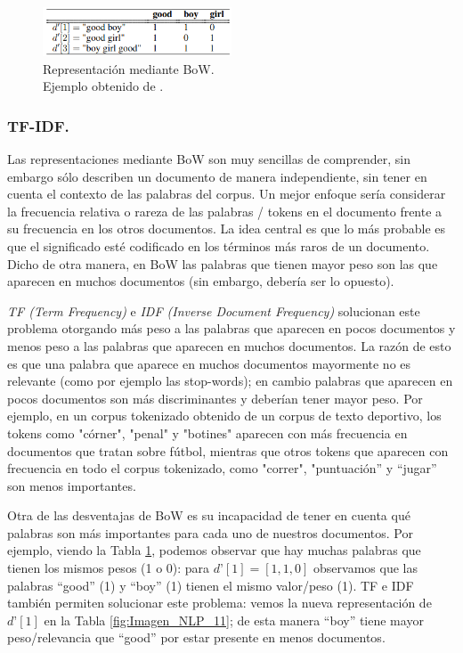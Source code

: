 \documentclass[12pt,a4paper]{article}
\begin{document}
\begin{sloppypar}
\begin{figure}[H]    
 \centering
 \includegraphics[width=0.5\textwidth]{images/NLP/8.png}
 \caption{Representación mediante BoW.\\ Ejemplo obtenido de \cite{NLP_2}.}
 \label{fig:Imagen_NLP_8}
\end{figure}

\subsubsection{TF-IDF.}\label{tf_idf}

Las representaciones mediante BoW son muy sencillas de comprender, sin embargo sólo describen un documento de manera independiente, sin tener en cuenta el contexto de las palabras del corpus. Un mejor enfoque sería considerar la frecuencia relativa o rareza de las palabras / tokens en el documento frente a su frecuencia en los otros documentos. La idea central es que lo más probable es que el significado esté codificado en los términos más raros de un documento. Dicho de otra manera, en BoW las palabras que tienen mayor peso son las que aparecen en muchos documentos (sin embargo, debería ser lo opuesto). 

\textit{TF (Term Frequency)} e \textit{IDF (Inverse Document Frequency)} solucionan este problema otorgando más peso a las palabras que aparecen en pocos documentos y menos peso a las palabras que aparecen en muchos documentos. La razón de esto es que una palabra que aparece en muchos documentos mayormente no es relevante (como por ejemplo las stop-words); en cambio palabras que aparecen en pocos documentos son más discriminantes y deberían tener mayor peso.  Por ejemplo, en un corpus tokenizado obtenido de un corpus de texto deportivo, los tokens como "córner", "penal" y "botines" aparecen con más frecuencia en documentos que tratan sobre fútbol, mientras que otros tokens que aparecen con frecuencia en todo el corpus tokenizado, como "correr", "puntuación” y “jugar” son menos importantes\cite{NLP_7}.

Otra de las desventajas de BoW es su incapacidad de tener en cuenta qué palabras son más importantes para cada uno de nuestros documentos\cite{NLP_2}. Por ejemplo, viendo la Tabla \ref{fig:Imagen_NLP_8}, podemos observar que hay muchas palabras que tienen los mismos pesos (1 o 0): para $d’[1] = [1,1,0]$ observamos que las palabras “good” (1) y “boy” (1) tienen el mismo valor/peso (1). TF e IDF también permiten solucionar este problema: vemos la nueva representación de $d’[1]$ en la Tabla \ref{fig:Imagen_NLP_11}; de esta manera “boy” tiene mayor peso/relevancia que “good” por estar presente en menos documentos.


\end{sloppypar}
\end{document}

